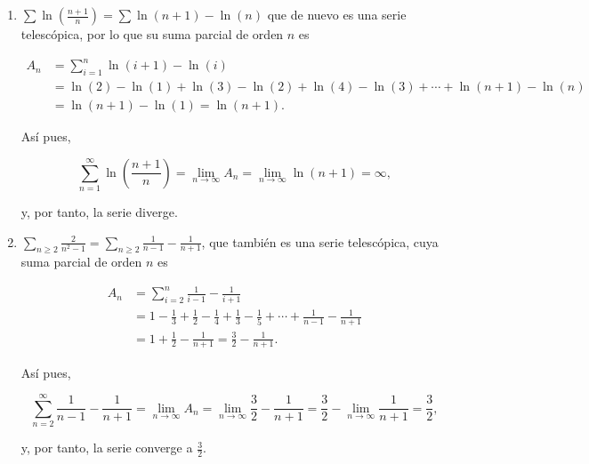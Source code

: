 \documentclass[
  spanish,
  a4paper,
]{scrreport}
\theoremstyle{definition}
\theoremstyle{remark}
\begin{document}
\begin{tcolorbox}
\begin{enumerate}
  \begin{align*}
   \sum_{n=1}^\infty  \operatorname{sen}\left(\frac{1}{n}\right) - \operatorname{sen}\left(\frac{1}{n+1}\right) &= \lim_{n\to\infty} A_n = \lim_{n\to\infty} \operatorname{sen}(1)- \operatorname{sen}\left(\frac{1}{n+1}\right) \\ 
   &= \operatorname{sen}(1)- \lim_{n\to\infty}\operatorname{sen}\left(\frac{1}{n+1}\right) = \operatorname{sen}(1),
   \end{align*}

  y, por tanto, la serie converge a \(\operatorname{sen}(1)\).
\item
  \(\sum \ln\left(\frac{n+1}{n}\right) = \sum \ln(n+1)-\ln(n)\) que de
  nuevo es una serie telescópica, por lo que su suma parcial de orden
  \(n\) es

  \begin{align*}
   A_n &= \sum_{i=1}^n \ln(i+1)-\ln(i) \\ 
   &= \ln(2)-\ln(1)+\ln(3)-\ln(2)+\ln(4)-\ln(3)+\cdots +\ln(n+1)-\ln(n) \\ 
   &= \ln(n+1)-\ln(1) = \ln(n+1).
   \end{align*}

  Así pues,

  \[
   \sum_{n=1}^\infty \ln\left(\frac{n+1}{n}\right) = \lim_{n\to\infty} A_n = \lim_{n\to\infty} \ln(n+1) =\infty,
   \]

  y, por tanto, la serie diverge.
\item
  \(\sum_{n\geq 2} \frac{2}{n^2-1} = \sum_{n\geq 2} \frac{1}{n-1}-\frac{1}{n+1}\),
  que también es una serie telescópica, cuya suma parcial de orden \(n\)
  es

  \begin{align*}
   A_n &= \sum_{i=2}^n \frac{1}{i-1}-\frac{1}{i+1} \\ 
   &= 1-\frac{1}{3}+\frac{1}{2}-\frac{1}{4}+\frac{1}{3}-\frac{1}{5}+\cdots + \frac{1}{n-1}-\frac{1}{n+1} \\ 
   &= 1+\frac{1}{2}-\frac{1}{n+1} = \frac{3}{2}-\frac{1}{n+1}.
   \end{align*}

  Así pues,

  \[
   \sum_{n=2}^\infty \frac{1}{n-1}-\frac{1}{n+1} = \lim_{n\to\infty} A_n = \lim_{n\to\infty}\frac{3}{2}-\frac{1}{n+1} = \frac{3}{2}-\lim_{n\to\infty}\frac{1}{n+1} =\frac{3}{2},
   \]

  y, por tanto, la serie converge a \(\frac{3}{2}\).
\end{enumerate}

\end{tcolorbox}
\end{document}
